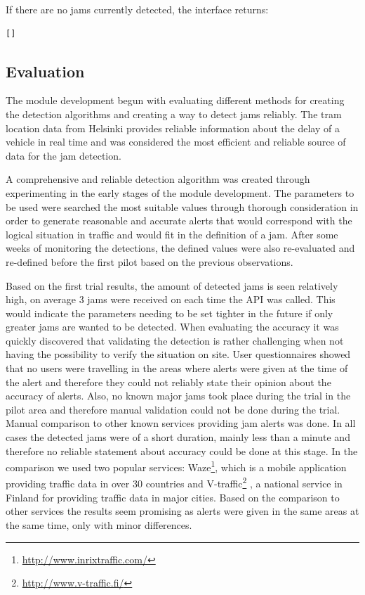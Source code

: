 If there are no jams currently detected, the interface returns:
\begin{verbatim}
[]
\end{verbatim}


\subsection{Evaluation}
The module development begun with evaluating different methods for
creating the detection algorithms and creating a way to detect jams
reliably. The tram location data from Helsinki provides reliable
information about the delay of a vehicle in real time and was
considered the most efficient and reliable source of data for the jam
detection.

A comprehensive and reliable detection algorithm was created through
experimenting in the early stages of the module development. The
parameters to be used were searched the most suitable values through
thorough consideration in order to generate reasonable and accurate
alerts that would correspond with the logical situation in traffic and
would fit in the definition of a jam. After some weeks of monitoring
the detections, the defined values were also re-evaluated and
re-defined before the first pilot based on the previous observations. 

Based on the first trial results, the amount of detected jams is seen
relatively high, on average 3 jams were received on each time the API
was called. This would indicate the parameters needing to be set
tighter in the future if only greater jams are wanted to be
detected. When evaluating the accuracy it was quickly discovered that
validating the detection is rather challenging when not having the
possibility to verify the situation on site. User questionnaires
showed that no users were travelling in the areas where alerts were
given at the time of the alert and therefore they could not reliably
state their opinion about the accuracy of alerts. Also, no known major
jams took place during the trial in the pilot area and therefore
manual validation could not be done during the trial. Manual
comparison to other known services providing jam alerts was done. In
all cases the detected jams were of a short duration, mainly less than
a minute and therefore no reliable statement about accuracy could be
done at this stage. In the comparison we used two popular services:
Waze\footnote{\url{http://www.inrixtraffic.com/}}, which is a mobile
application providing traffic data in over 30 countries and
V-traffic\footnote{\url{http://www.v-traffic.fi/}} , a national
service in Finland for providing traffic data in major cities. Based
on the comparison to other services the results seem promising as
alerts were given in the same areas at the same time, only with minor
differences.

